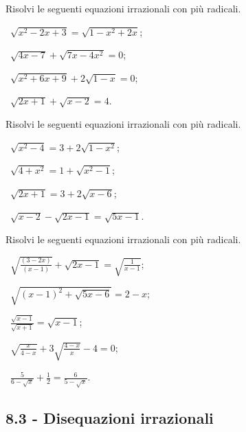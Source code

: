 \begin{esercizio}[\Ast]
 \label{ese:8.15}
Risolvi le seguenti equazioni irrazionali con più radicali.
\begin{multicols}{2}
 \begin{enumeratea}
 \item~$\sqrt{x^2-2x+3}=\sqrt{1-x^2+2x}$;
 \item~$\sqrt{4x-7}+\sqrt{7x-4x^2}=0$;
 \item~$\sqrt{x^2+6x+9}+2\sqrt{1-x}=0$;
 \item~$\sqrt{2x+1}+\sqrt{x-2}=4$.
 \end{enumeratea}
 \end{multicols}
\end{esercizio}

\begin{esercizio}[\Ast]
 \label{ese:8.16}
Risolvi le seguenti equazioni irrazionali con più radicali.
\begin{multicols}{2}
 \begin{enumeratea}
 \item~$\sqrt{x^2-4}=3+2\sqrt{1-x^2}$;
 \item~$\sqrt{4+x^2}=1+\sqrt{x^2-1}$;
 \item~$\sqrt{2x+1}=3+2\sqrt{x-6}$;
 \item~$\sqrt{x-2}-\sqrt{2x-1}=\sqrt{5x-1}$.
 \end{enumeratea}
 \end{multicols}
\end{esercizio}
\newpage
\begin{esercizio}[\Ast]
 \label{ese:8.17}
Risolvi le seguenti equazioni irrazionali con più radicali.
\begin{multicols}{2}
 \begin{enumeratea}
 \item~$\sqrt{\frac{(3-2x)}{(x-1)}}+\sqrt{2x-1}=\sqrt{\frac 1{x-1}}$;
 \item~$\sqrt{(x-1)^2+\sqrt{5x-6}}=2-x$;
 \item~$\frac{\sqrt{x-1}}{\sqrt{x+1}}=\sqrt{x-1}$;
 \item~$\sqrt{\frac x{4-x}}+3\sqrt{\frac{4-x} x}-4=0$;
 \item~$\frac 5{6-\sqrt x}+\frac 1 2=\frac 6{5-\sqrt x}$.
 \end{enumeratea}
 \end{multicols}
\end{esercizio}

\subsection*{8.3 - Disequazioni irrazionali}

